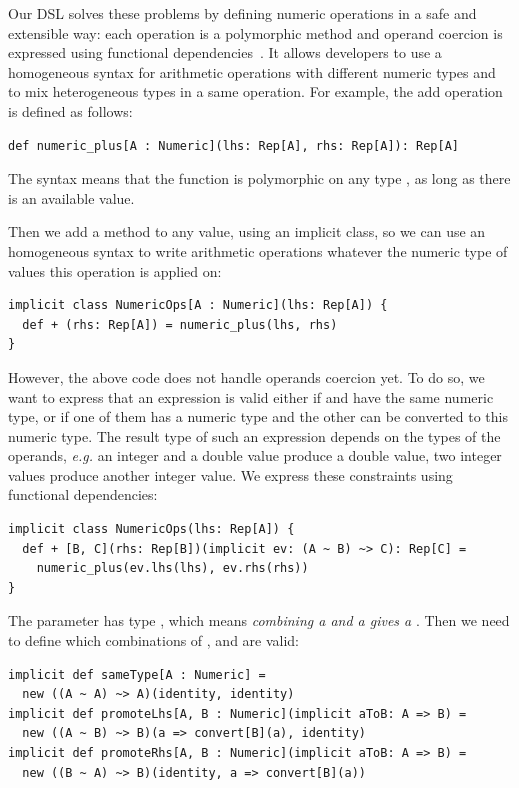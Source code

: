 \documentclass[american,english,runningheads]{llncs}
\newcommand{\eg}{\emph{e.g.}}
\begin{document}
Our DSL solves these problems by defining numeric operations in a safe and extensible way: each operation is a
polymorphic method and operand coercion is expressed using functional dependencies~\cite{Jones00_FunDeps}. It allows
developers to use a homogeneous syntax for arithmetic operations with different numeric types and to mix
heterogeneous types in a same operation. For example, the add operation is defined as follows:

\begin{lstlisting}
def numeric_plus[A : Numeric](lhs: Rep[A], rhs: Rep[A]): Rep[A]
\end{lstlisting}

The  syntax means that the function is polymorphic on any type , as long as there is an
available  value.

Then we add a \code{+} method to any  value, using an implicit class, so we can use an homogeneous
syntax to write arithmetic operations whatever the numeric type of values this operation is applied on:

\begin{lstlisting}
implicit class NumericOps[A : Numeric](lhs: Rep[A]) {
  def + (rhs: Rep[A]) = numeric_plus(lhs, rhs)
}
\end{lstlisting}

However, the above code does not handle operands coercion yet. To do so, we want to express that an expression
 is valid either if  and  have the same numeric type, or if one of them has a numeric
type and the other can be converted to this numeric type. The result type of such an expression depends on the types
of the operands, \eg{} an integer and a double value produce a double value, two integer values produce another
integer value. We express these constraints using functional dependencies:

\begin{lstlisting}
implicit class NumericOps(lhs: Rep[A]) {
  def + [B, C](rhs: Rep[B])(implicit ev: (A ~ B) ~> C): Rep[C] =
    numeric_plus(ev.lhs(lhs), ev.rhs(rhs))
}
\end{lstlisting}

The  parameter has type , which means \emph{combining a  and a  gives a
}. Then we need to define which combinations of ,  and  are valid:

\begin{lstlisting}
implicit def sameType[A : Numeric] =
  new ((A ~ A) ~> A)(identity, identity)
implicit def promoteLhs[A, B : Numeric](implicit aToB: A => B) =
  new ((A ~ B) ~> B)(a => convert[B](a), identity)
implicit def promoteRhs[A, B : Numeric](implicit aToB: A => B) =
  new ((B ~ A) ~> B)(identity, a => convert[B](a))
\end{lstlisting}
\end{document}
